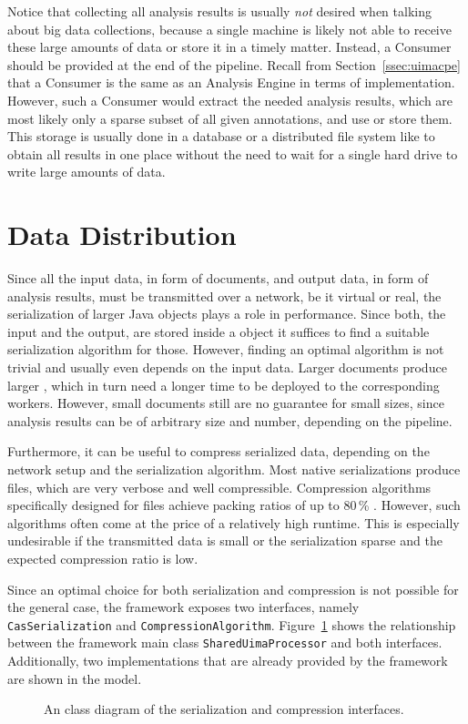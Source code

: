 Notice that collecting all analysis results is usually \emph{not} desired when talking about big data collections, because a single machine is likely not able to receive these large amounts of data or store it in a timely matter. Instead, a \cas{} Consumer should be provided at the end of the pipeline. Recall from Section~\ref{ssec:uimacpe} that a \cas{} Consumer is the same as an Analysis Engine in terms of implementation. However, such a \cas{} Consumer would extract the needed analysis results, which are most likely only a sparse subset of all given annotations, and use or store them. This storage is usually done in a database or a distributed file system like \hdfs{} to obtain all results in one place without the need to wait for a single hard drive to write large amounts of data.

\section{Data Distribution}
\label{sec:distribution}
Since all the input data, in form of documents, and output data, in form of analysis results, must be transmitted over a network, be it virtual or real, the serialization of larger Java objects plays a role in performance. Since both, the input and the output, are stored inside a \cas{} object it suffices to find a suitable serialization algorithm for those. However, finding an optimal algorithm is not trivial and usually even depends on the input data. Larger documents produce larger \cas{}, which in turn need a longer time to be deployed to the corresponding \spark{} workers. However, small documents still are no guarantee for small \cas{} sizes, since analysis results can be of arbitrary size and number, depending on the \uima{} pipeline. 

Furthermore, it can be useful to compress serialized data, depending on the network setup and the serialization algorithm. Most native \uima{} serializations produce \xml{} files, which are very verbose and well compressible. Compression algorithms specifically designed for \xml{} files achieve packing ratios of up to 80\,\% \cite{girardot2005system,min2003xpress,sakr2009xml}. However, such algorithms often come at the price of a relatively high runtime. This is especially undesirable if the transmitted data is small or the serialization sparse and the expected compression ratio is low.

Since an optimal choice for both serialization and compression is not possible for the general case, the framework exposes two interfaces, namely \lstinline|CasSerialization| and \lstinline|CompressionAlgorithm|. Figure~\ref{fig:interfaces} shows the relationship between the framework main class \lstinline|SharedUimaProcessor| and both interfaces. Additionally, two implementations that are already provided by the framework are shown in the model.
\begin{figure}[htb]
	\centering
	\resizebox{\linewidth}{!}{\small}
	\caption[An UML class diagram of the serialization and compression interfaces.]{An \uml{} class diagram of the serialization and compression interfaces.}
	\label{fig:interfaces}
\end{figure}
